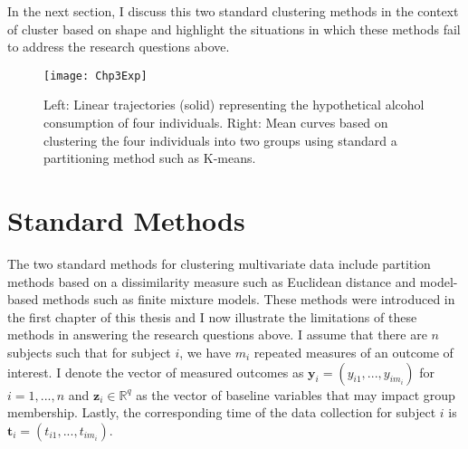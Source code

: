 \documentclass[12pt]{article}
\newcommand{\B}[0]{\mathbf}
\begin{document}
In the next section, I discuss this two standard clustering methods in the context of cluster based on shape and highlight the situations in which these methods fail to address the research questions above. 
\begin{figure}
\begin{center}
\texttt{[image: Chp3Exp]}
\end{center}
\caption{Left: Linear trajectories (solid) representing the hypothetical alcohol consumption of four individuals. Right: Mean curves based on clustering the four individuals into two groups using standard a partitioning method such as K-means.}
\label{fig:Chp3Exp}
\end{figure}
\section{Standard Methods}
The two standard methods for clustering multivariate data include partition methods based on a dissimilarity measure such as Euclidean distance and model-based methods such as finite mixture models. These methods were introduced in the first chapter of this thesis and I now illustrate the limitations of these methods in answering the research questions above. I assume that there are $n$ subjects such that for subject $i$, we have $m_{i}$ repeated measures of an outcome of interest. I denote the vector of measured outcomes as $\B y_{i}=(y_{i1},...,y_{im_{i}})$ for $i=1,...,n$ and $\B z_{i}\in \mathbb{R}^{q}$ as the vector of baseline variables that may impact group membership. Lastly, the corresponding time of the data collection for subject $i$ is $\B t_{i}=(t_{i1},...,t_{im_{i}})$. 
\end{document}
